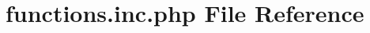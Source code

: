 \hypertarget{functions_8inc_8php}{}\section{functions.\+inc.\+php File Reference}
\label{functions_8inc_8php}
